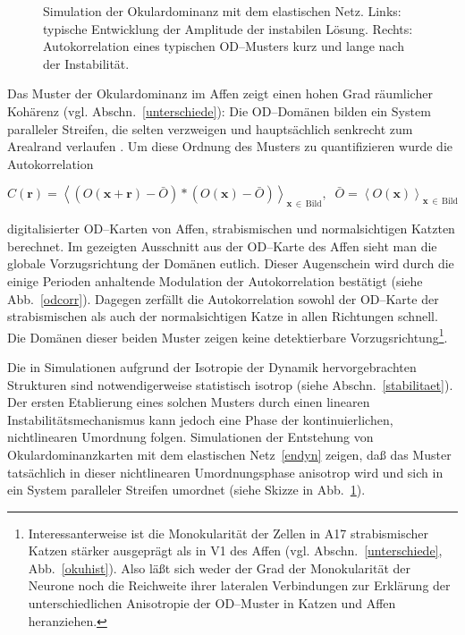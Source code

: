 \begin{figure}[t]
\begin{center}
\end{center}
\caption{Simulation der Okulardominanz mit dem elastischen Netz. Links:
typische Entwicklung der Amplitude der instabilen Lösung. Rechts:
Autokorrelation eines typischen OD--Musters kurz und lange nach der
Instabilität.}
\label{umordnung}
\end{figure}

Das Muster der Okulardominanz im Affen zeigt einen hohen Grad räumlicher
Kohärenz (vgl. Abschn.~\ref{unterschiede}): Die OD--Domänen bilden ein
System paralleler Streifen, die selten verzweigen und hauptsächlich
senkrecht zum Arealrand verlaufen . Um diese Ordnung des Musters zu quantifizieren wurde die
Autokorrelation

\begin{small}
\begin{equation}
C(\mathbf{r})=\left<\left(O(\mathbf{x+r})-\bar{O}\right)\ast\left(O(\mathbf{x})-\bar{O}\right)\right>_{\mathbf{x}\,\in\,\text{Bild}},\;\;\bar{O}=\left<O(\mathbf{x})\right>_{\mathbf{x}\,\in\,\text{Bild}}
\label{autocorr}
\end{equation}
\end{small}

\noindent digitalisierter OD--Karten von Affen, strabismischen und
normalsichtigen Katzten berechnet.  Im gezeigten Ausschnitt aus der
OD--Karte des Affen sieht man die globale Vorzugsrichtung der Domänen
eutlich.  Dieser Augenschein wird durch die einige Perioden anhaltende
Modulation der Autokorrelation bestätigt (siehe Abb.~\ref{odcorr}).
Dagegen zerfällt die Autokorrelation sowohl der OD--Karte der
strabismischen als auch der normalsichtigen Katze in allen Richtungen
schnell. Die Domänen dieser beiden Muster zeigen keine detektierbare
Vorzugsrichtung\footnote{Interessanterweise ist die Monokularität der
Zellen in A17 strabismischer Katzen stärker ausgeprägt als in V1 des
Affen (vgl. Abschn.~\ref{unterschiede}, Abb.~\ref{okuhist}).  Also läßt
sich weder der Grad der Monokularität der Neurone noch die Reichweite
ihrer lateralen Verbindungen zur Erklärung der unterschiedlichen
Anisotropie der OD--Muster in Katzen und Affen heranziehen.}.
\setcounter{footnote}{1}

Die in Simulationen aufgrund der Isotropie der Dynamik
hervorgebrachten Strukturen sind notwendigerweise statistisch isotrop
(siehe Abschn.~\ref{stabilitaet}).  Der ersten Etablierung eines solchen
Musters durch einen linearen Instabilitätsmechanismus kann jedoch
eine Phase der kontinuierlichen, nichtlinearen Umordnung folgen.  Simulationen der Entstehung von Okulardominanzkarten mit
dem elastischen Netz~\eqref{endyn} zeigen, daß das Muster tatsächlich in
dieser nichtlinearen Umordnungsphase anisotrop wird und sich in ein System
paralleler Streifen umordnet (siehe Skizze in
Abb.~\ref{umordnung}).

